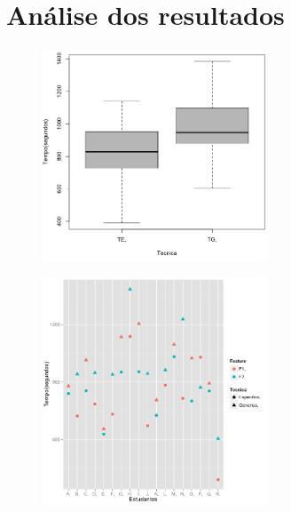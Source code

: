 \section{An\'alise dos resultados}
\label{sec:resultados}






\begin{figure}[t]
    \centering
    \includegraphics[width=0.6\textwidth]{images/boxplot.png}
    \caption{}
    \label{fig:boxplot}
\end{figure}

\begin{figure}[t]
    \centering
    \includegraphics[width=0.6\textwidth]{images/dotplot.png}
    \caption{}
    \label{fig:dotplot}
\end{figure}